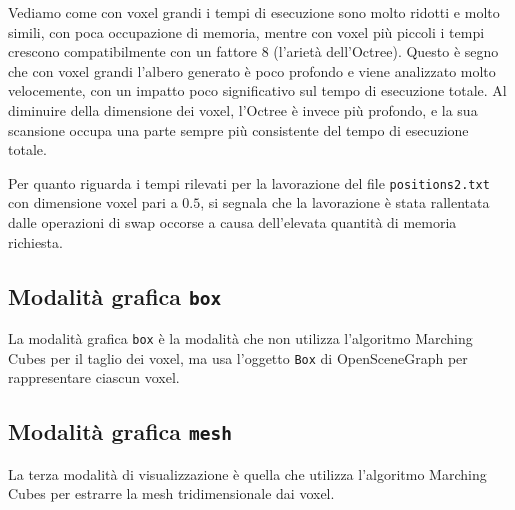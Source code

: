 Vediamo come con voxel grandi i tempi di esecuzione sono molto ridotti e molto simili, con poca occupazione di memoria, mentre con voxel più piccoli i tempi crescono compatibilmente con un fattore 8 (l'arietà dell'Octree). Questo è segno che con voxel grandi l'albero generato è poco profondo e viene analizzato molto velocemente, con un impatto poco significativo sul tempo di esecuzione totale. Al diminuire della dimensione dei voxel, l'Octree è invece più profondo, e la sua scansione occupa una parte sempre più consistente del tempo di esecuzione totale.

Per quanto riguarda i tempi rilevati per la lavorazione del file \texttt{positions2.txt} con dimensione voxel pari a $0.5$, si segnala che la lavorazione è stata rallentata dalle operazioni di swap occorse a causa dell'elevata quantità di memoria richiesta.

\subsection{Modalità grafica \texttt{box}}
La modalità grafica \texttt{box} è la modalità che non utilizza l'algoritmo Marching Cubes per il taglio dei voxel, ma usa l'oggetto \texttt{Box} di OpenSceneGraph per rappresentare ciascun voxel.

\subsection{Modalità grafica \texttt{mesh}}
La terza modalità di visualizzazione è quella che utilizza l'algoritmo Marching Cubes per estrarre la mesh tridimensionale dai voxel.

